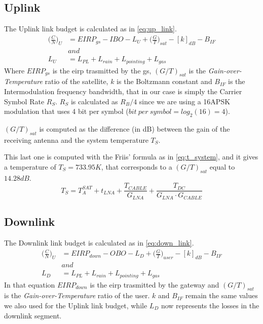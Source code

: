 \subsection{Uplink}
	The Uplink link budget is calculated as in \autoref{eq:up_link}.
	\begin{equation} \label{eq:up_link}
		\begin{split}
			\bigg(\frac{C}{N}\bigg)_U &= EIRP_{gs} - IBO - L_U + \bigg(\frac{G}{T}\bigg)_{sat} - [k]_{dB} - B_{IF}\\
			&and\\
			L_U &= L_{PL} + L_{rain} + L_{pointing} + L_{gas}
		\end{split}
	\end{equation}
	Where $EIRP_{gs}$ is the \gls{eirp} trasmitted by the \gls{gs}, $(G/T)_{sat}$ is the \textit{Gain-over-Temperature} ratio of the satellite, $k$ is the Boltzmann constant and $B_{IF}$ is the Intermodulation frequency bandwidth, that in our case is simply the Carrier Symbol Rate $R_S$.
	$R_S$ is calculated as $R_B/4$ since we are using a 16APSK modulation that uses 4 bit per symbol ($bit ~per ~symbol = log_2(16) = 4$).

	$(G/T)_{sat}$ is computed as the difference (in dB) between the gain of the receiving antenna and the system temperature $T_S$.

	This last one is computed with the Friis' formula as in \autoref{eq:t_system}, and it gives a temperature of $T_S = 733.95K$, that corresponds to a $(G/T)_{sat}$ equal to $14.28dB$.
	\begin{equation}\label{eq:t_system}
		T_S = T_A^{SAT} + t_{LNA} + \frac{T_{CABLE}}{G_{LNA}} + \frac{T_{DC}}{G_{LNA}\cdot G_{CABLE}}
	\end{equation}
\subsection{Downlink}
	The Downlink link budget is calculated as in \autoref{eq:down_link}.
	\begin{equation}
	\begin{split}
			\bigg(\frac{C}{N}\bigg)_U &= EIRP_{down} - OBO - L_D + \bigg(\frac{G}{T}\bigg)_{user} - [k]_{dB} - B_{IF}\\
	&and\\
			L_D &= L_{PL} + L_{rain} + L_{pointing} + L_{gas}
	\end{split}
	\label{eq:down_link}
	\end{equation}
	In that equation $EIRP_{down}$ is the \gls{eirp} trasmitted by the gateway and $(G/T)_{sat}$ is the \textit{Gain-over-Temperature} ratio of the user. $k$ and $B_{IF}$ remain the same values we also used for the Uplink link budget, while $L_D$ now represents the losses in the downlink segment.

